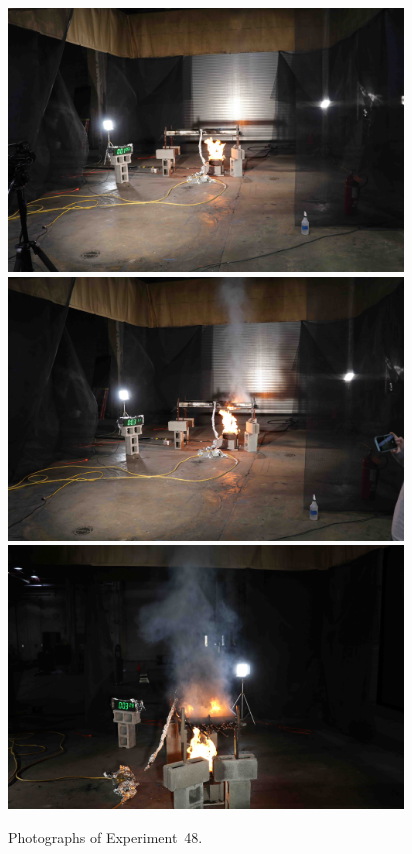 \documentclass[12pt]{article}
\begin{document}
\begin{figure}[p]
\centering
\includegraphics[height=2.75in]{../FIGURES/Test_48_1_min_3_s} \\
\includegraphics[height=2.75in]{../FIGURES/Test_48_3_min_11_s} \\
\includegraphics[height=2.75in]{../FIGURES/Test_48_3_min_28_s}
\caption[Photographs of Experiment~48]{Photographs of Experiment~48.}
\label{fig:Test_48_photos}
\end{figure}


\clearpage
\end{document}
